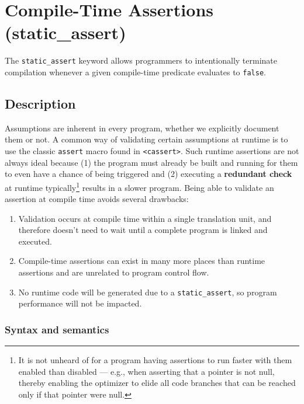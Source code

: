 \newpage
\section[Compile-Time Assertions ({\tt{static\_assert}})]{Compile-Time Assertions ({\SecCode static\_assert})}\label{compile-time-assertions-(static_assert)}


The \texttt{static\_assert} keyword allows programmers to intentionally terminate compilation whenever a given compile-time predicate
evaluates to \texttt{false}.

\subsection[Description]{Description}\label{description}

Assumptions are
inherent in every program, whether we explicitly document them or not. A common way of validating certain
assumptions at runtime is to use the classic \texttt{assert} macro found
in \texttt{<cassert>}. Such runtime assertions are not always ideal
because (1) the program must already be built and running for them to
even have a chance of being triggered and (2) executing a
\textbf{redundant check} at runtime typically{\cprotect\footnote{It is
not unheard of for a program having assertions to run faster with them
enabled than disabled --- e.g., when asserting that a pointer is not
null, thereby enabling the optimizer to elide all code branches that
can be reached only if that pointer were null.}} results in a slower
program. Being able to validate an assertion at compile time avoids
several drawbacks:

\begin{enumerate}
\item{Validation occurs at compile time within a single translation unit, and therefore doesn’t need to wait until a complete program is linked and executed.}
\item{Compile-time assertions can exist in many more places than runtime assertions and are unrelated to program control flow.}
\item{No runtime code will be generated due to a \texttt{static\_assert}, so program performance will not be impacted.}
\end{enumerate}

\subsubsection[Syntax and semantics]{Syntax and semantics}\label{syntax-and-semantics}

